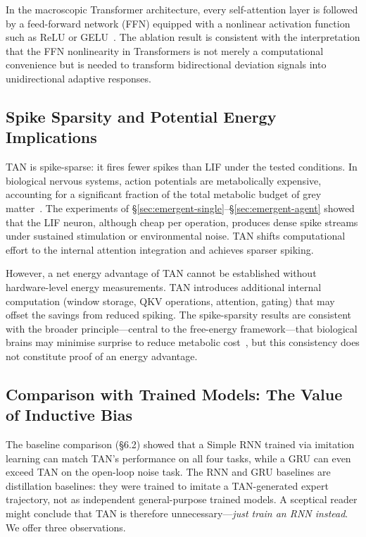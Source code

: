 In the macroscopic Transformer architecture, every self-attention layer is followed by a feed-forward network (FFN) equipped with a nonlinear activation function such as ReLU or GELU~\cite{vaswani2017,lin2022survey}. The ablation result is consistent with the interpretation that the FFN nonlinearity in Transformers is not merely a computational convenience but is needed to transform bidirectional deviation signals into unidirectional adaptive responses.

\subsection{Spike Sparsity and Potential Energy Implications}

TAN is spike-sparse: it fires fewer spikes than LIF under the tested conditions. In biological nervous systems, action potentials are metabolically expensive, accounting for a significant fraction of the total metabolic budget of grey matter~\cite{attwell2001}. The experiments of \S\ref{sec:emergent-single}--\S\ref{sec:emergent-agent} showed that the LIF neuron, although cheap per operation, produces dense spike streams under sustained stimulation or environmental noise. TAN shifts computational effort to the internal attention integration and achieves sparser spiking.

However, a net energy advantage of TAN cannot be established without hardware-level energy measurements. TAN introduces additional internal computation (window storage, QKV operations, attention, gating) that may offset the savings from reduced spiking. The spike-sparsity results are consistent with the broader principle---central to the free-energy framework---that biological brains may minimise surprise to reduce metabolic cost~\cite{friston2010,sengupta2010}, but this consistency does not constitute proof of an energy advantage.

\subsection{Comparison with Trained Models: The Value of Inductive Bias}

The baseline comparison (\S6.2) showed that a Simple RNN trained via imitation learning can match TAN's performance on all four tasks, while a GRU can even exceed TAN on the open-loop noise task. The RNN and GRU baselines are distillation baselines: they were trained to imitate a TAN-generated expert trajectory, not as independent general-purpose trained models. A sceptical reader might conclude that TAN is therefore unnecessary---\textit{just train an RNN instead}. We offer three observations.

